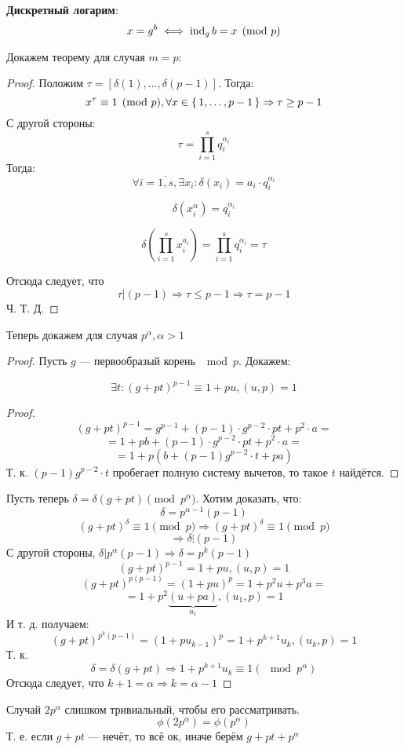\begin{definition}
  \textbf{Дискретный логарим}:
  \[
    x = g^{b} \iff \operatorname{ind}_{g} b = x \pmod p
  \]
\end{definition}

Докажем теорему для случая $m = p\colon$
\begin{proof}
  Положим $\tau = [\delta(1), \ldots, \delta(p - 1)]$. Тогда:
  \[
  x^{\tau} \equiv 1 \pmod p, \forall x \in \set{1, \ldots, p - 1} \Rightarrow \tau \geq p - 1
  \]
  С другой стороны:
  \[
  \tau = \prod_{i = 1}^{s} q_i^{\alpha_i}
  \]
  Тогда:
  \[
  \forall i = \overline{1,s}, \exists x_i \colon \delta(x_i) = a_i \cdot q_i ^{\alpha_i}
  \]
  \begin{statement}
    \[
      \delta(x_i^{\alpha}) = q_i^{\alpha_i}
    \]
  \end{statement}
  \begin{statement}
    \[
    \delta \left(\prod_{i = 1}^{s} x_i^{a_i}\right) = \prod_{i = 1}^{s} q_i^{\alpha_i} = \tau
    \]
  \end{statement}
  Отсюда следует, что
  \[
    \tau | (p - 1) \Rightarrow \tau \leq p - 1 \Rightarrow \tau = p - 1
  \]
  Ч. Т. Д.
\end{proof}

Теперь докажем для случая $p ^{\alpha}, \alpha > 1$
\begin{proof}
Пусть $g$ --- первообразый корень $\mod p$. Докажем:
\begin{lemma}
\[
\exists t \colon (g + pt)^{p - 1} \equiv 1 + pu, (u, p) = 1
\]
\end{lemma}
\begin{proof}
  \[
    (g + pt)^{p - 1} = g^{p - 1} + (p - 1) \cdot g^{p - 2} \cdot pt + p ^{2} \cdot a = 
  \]
  \[
   = 1 + pb + (p - 1) \cdot g^{p - 2} \cdot pt + p ^{2} \cdot a = 
  \]
  \[
   = 1 + p (b + (p - 1)g ^{p - 2} \cdot t + pa)
  \]
  Т. к. $(p - 1) g^{p - 2} \cdot t$ пробегает полную систему вычетов, то такое $t$ найдётся. 
\end{proof}

Пусть теперь $\delta = \delta(g + pt) \pmod p ^{\alpha}$. Хотим доказать, что:
\[
  \delta = p ^{\alpha - 1}(p - 1)
\]
\[
  (g + pt)^{\delta} \equiv 1 \pmod p \Rightarrow (g + pt)^{ \delta} \equiv 1 \pmod p
\]
\[
\Rightarrow \delta \vdots (p - 1)
\]
С другой стороны, $\delta | p ^{\alpha}(p - 1) \Rightarrow \delta = p ^{k}(p - 1)$
\[
  (g + pt)^{p - 1} = 1 + pu, (u, p) = 1
\]
\[
  (g + pt)^{p(p - 1)} = (1 + pu)^{p} = 1 + p ^{2} u + p ^{3} a = 
\]
\[
 = 1 + p ^{2}\underbrace{(u + pa)}_{u_1}, (u_1, p) = 1
\]
И т. д. получаем:
\[
  (g + pt)^{p ^{k}(p - 1)} = (1 + pu_{k - 1})^{p} = 1 + p ^{k + 1} u_k, (u_k, p) = 1
\]
Т. к.
\[
  \delta = \delta(g + pt) \Rightarrow 1 + p ^{k + 1}u_k \equiv 1 (\mod p^{\alpha})
\]
Отсюда следует, что $k + 1 = \alpha \Rightarrow k = \alpha - 1$
\end{proof}
Случай $2p^{\alpha}$ слишком тривиальный, чтобы его рассматривать.
\[
  \phi(2 p ^{\alpha}) = \phi(p ^{\alpha})
\]
Т. е. если $g + pt$ --- нечёт, то всё ок, иначе берём $g + pt + p ^{\alpha}$\\

